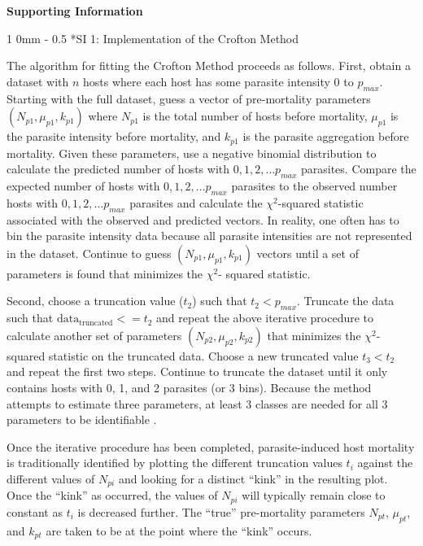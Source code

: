 \documentclass[12pt, a4paper]{article}
\makeatletter
\renewcommand{\section}{\@startsection
{section}%
{1}%
{0mm}%
{-\baselineskip}%
{0.5\baselineskip}%
{\normalfont\bf\large}} %
\makeatother
\begin{document}
\linenumbers

\doublespacing

\noindent
\Large{\textbf{Supporting Information}}

\normalsize

\section*{SI 1: Implementation of the Crofton Method}

The algorithm for fitting the Crofton Method \citep{Crofton1971a} proceeds as follows. First, obtain a dataset
with $n$ hosts where each host has some parasite intensity 0 to $p_{max}$. Starting
with the full dataset, guess a vector of pre-mortality parameters $(N_{p1}, \mu_{p1}, k_{p1})$ where $N_{p1}$ is the total number of hosts before mortality, $\mu_{p1}$ is the parasite intensity before mortality, and $k_{p1}$ is the parasite aggregation before mortality. Given
these parameters, use a negative binomial distribution to calculate the predicted number of hosts with $0, 1, 2, \dots
p_{max}$ parasites.  Compare the expected number of hosts with $0, 1, 2, \dots  p_{max}$ parasites
to the observed number hosts with $0, 1, 2, \dots p_{max}$ parasites and calculate
the $\chi^2$-squared statistic associated with the observed and predicted vectors. In reality, one often has to bin the parasite intensity data because all
parasite intensities are not represented in the dataset. Continue to guess $(N_{p1},
\mu_{p1}, k_{p1})$ vectors until a set of parameters is found that minimizes the $\chi^2$-
squared statistic.

Second, choose a truncation value ($t_2$) such that $t_2 <
p_{max}$. Truncate the data such that $\text{data}_\text{truncated} <= t_2$ and repeat the above
iterative procedure to calculate another set of parameters $(N_{p2}, \mu_{p2}, k_{p2})$
that minimizes the $\chi^2$-squared statistic on the truncated data. Choose a new
truncated value $t_3 < t_2$ and repeat the first two steps. Continue to truncate
the dataset until it only contains hosts with 0, 1, and 2 parasites (or 3 bins).
Because the method attempts to estimate three parameters, at least 3 classes are
needed for all 3 parameters to be identifiable \citep{Royce1990}.


Once the iterative procedure has been completed, parasite-induced host mortality is traditionally identified by plotting the different truncation values $t_{i}$ against the different values of $N_{pi}$ and looking for a distinct ``kink'' in the resulting plot.   Once the ``kink'' as occurred, the values of $N_{pi}$ will typically remain close to constant as $t_i$ is decreased further.  The ``true'' pre-mortality parameters $N_{pt}$, $\mu_{pt}$, and $k_{pt}$ are taken to be at the point where the ``kink'' occurs.
\end{document}
